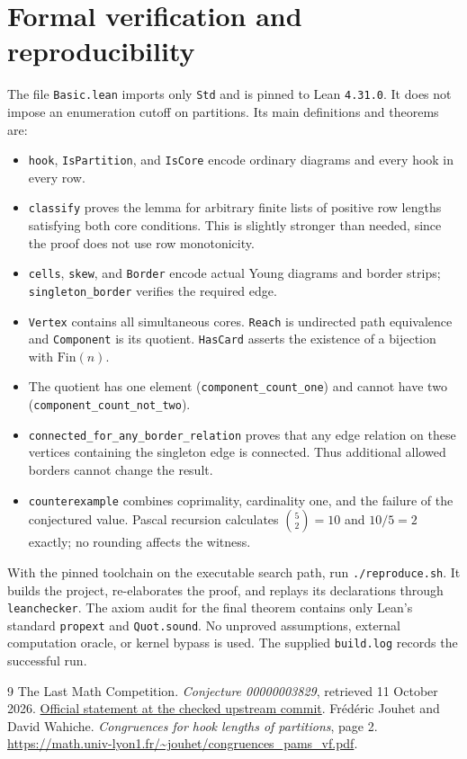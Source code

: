 \documentclass[10pt]{article}
\begin{document}
\section{Formal verification and reproducibility}
The file \texttt{Basic.lean} imports only \texttt{Std} and is pinned to
Lean \texttt{4.31.0}. It does not impose an enumeration cutoff on
partitions. Its main definitions and theorems are:
\begin{itemize}
\item \texttt{hook}, \texttt{IsPartition}, and \texttt{IsCore} encode
ordinary diagrams and every hook in every row.
\item \texttt{classify} proves the lemma for arbitrary finite lists of
positive row lengths satisfying both core conditions. This is slightly
stronger than needed, since the proof does not use row monotonicity.
\item \texttt{cells}, \texttt{skew}, and \texttt{Border} encode actual
Young diagrams and border strips; \texttt{singleton\_border} verifies
the required edge.
\item \texttt{Vertex} contains all simultaneous cores. \texttt{Reach}
is undirected path equivalence and \texttt{Component} is its quotient.
\texttt{HasCard} asserts the existence of a bijection with
$\mathrm{Fin}(n)$.
\item The quotient has one element (\texttt{component\_count\_one})
and cannot have two (\texttt{component\_count\_not\_two}).
\item \texttt{connected\_for\_any\_border\_relation} proves that any
edge relation on these vertices containing the singleton edge is
connected. Thus additional allowed borders cannot change the result.
\item \texttt{counterexample} combines coprimality, cardinality one,
and the failure of the conjectured value. Pascal recursion calculates
$\binom52=10$ and $10/5=2$ exactly; no rounding affects the witness.
\end{itemize}

With the pinned toolchain on the executable search path, run
\texttt{./reproduce.sh}. It builds the project, re-elaborates the proof,
and replays its declarations through \texttt{leanchecker}.
The axiom audit for the final theorem contains only Lean's standard
\texttt{propext} and \texttt{Quot.sound}. No unproved assumptions,
external computation oracle, or kernel bypass is used. The supplied
\texttt{build.log} records the successful run.

\begin{thebibliography}{9}
 The Last Math Competition.
\emph{Conjecture 00000003829}, retrieved 11 October 2026.
\href{https://github.com/The-Last-Math-Competition/The-Last-Math-Competition/blob/9b795e7a94a6076e49a65a6489e1caf9153abd23/conjectures/00000003829.md}{Official statement at the checked upstream commit}.
 Fr\'ed\'eric Jouhet and David Wahiche.
\emph{Congruences for hook lengths of partitions}, page 2.
\url{https://math.univ-lyon1.fr/~jouhet/congruences_pams_vf.pdf}.
\end{thebibliography}
\end{document}
